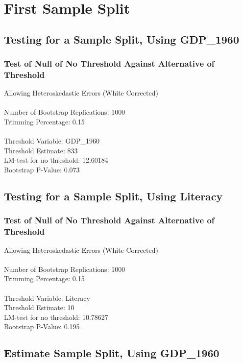 \section{First Sample Split} 

\subsection{Testing for a Sample Split, Using GDP\_1960} 
\subsubsection*{Test of Null of No Threshold Against Alternative of Threshold} 
Allowing Heteroskedastic Errors (White Corrected) \\\\
Number of Bootstrap Replications:  1000 \\
Trimming Percentage:               0.15 \\\\
Threshold Variable:                 GDP\_1960 \\
Threshold Estimate:                833 \\
LM-test for no threshold:          12.60184 \\
Bootstrap P-Value:                 0.073 \\

\subsection{Testing for a Sample Split, Using Literacy} 
\subsubsection*{Test of Null of No Threshold Against Alternative of Threshold} 
Allowing Heteroskedastic Errors (White Corrected) \\\\
Number of Bootstrap Replications:  1000 \\
Trimming Percentage:               0.15 \\\\
Threshold Variable:                 Literacy \\
Threshold Estimate:                10 \\
LM-test for no threshold:          10.78627 \\
Bootstrap P-Value:                 0.195 \\

\subsection{Estimate Sample Split, Using GDP\_1960} 

